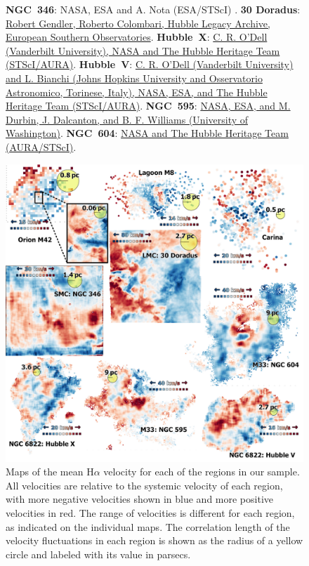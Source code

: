 \documentclass[fleqn,usenatbib, useAMS, a4paper]{mnras}
\newcommand\ha{\ensuremath{\text{H}\alpha}}
\begin{document}
\begin{figure}
{    \textbf{NGC~346}:
    NASA, ESA and A. Nota (ESA/STScI) \citep{Nota:2006x}.
    \textbf{30 Doradus}:
    \href{http://www.robgendlerastropics.com/Tarantula-HST-ESO.html}{
      Robert Gendler, Roberto Colombari,
      Hubble Legacy Archive, European Southern Observatories}.
    \textbf{Hubble~X}:
    \href{https://hubblesite.org/contents/media/images/2001/01/1012-Image.html}
    {C. R. O'Dell (Vanderbilt University),
      NASA and The Hubble Heritage Team (STScI/AURA)}.
    \textbf{Hubble~V}:
    \href{https://hubblesite.org/contents/media/images/2001/39/1126-Image.html}
    {C. R. O'Dell (Vanderbilt University)
      and L. Bianchi (Johns Hopkins University and Osservatorio Astronomico, Torinese, Italy),
      NASA, ESA, and The Hubble Heritage Team (STScI/AURA)}.
    \textbf{NGC~595}:
    \href{https://esahubble.org/images/heic1901c/}
    {NASA, ESA,
      and M. Durbin, J. Dalcanton, and B. F. Williams (University of Washington)}.
    \textbf{NGC~604}:
    \href{https://hubblesite.org/contents/media/images/2003/30/1423-Image.html}
    {NASA and The Hubble Heritage Team (AURA/STScI)}.
  }
  \label{fig:hii-regions}
\end{figure}

\begin{figure}
  \centering
  \includegraphics[width=\linewidth]{Figures/velocity-maps-mosaic}
  \caption{
    Maps of the mean \ha{} velocity for each of the regions in our sample.
    All velocities are relative to the systemic velocity of each region,
    with more negative velocities shown in blue and more positive velocities in red.
    The range of velocities is different for each region, as indicated on the individual maps.
    The correlation length of the velocity fluctuations in each region
    is shown as the radius of a yellow circle and labeled with its value in parsecs. 
  }
  \label{fig:velocity-maps}
\end{figure}
\end{document}
